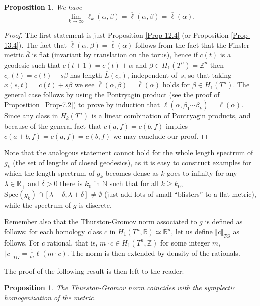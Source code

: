 \documentclass[JEP,XML,SOM,NoFloatCountersInSection,Unicode,published]{cedram}
\numberwithin{equation}{section}
\theoremstyle{plain}
\newtheorem{proposition}[theorem]{Proposition}
\theoremstyle{definition}
\theoremstyle{remark}
\begin{document}
\begin{proposition}
We have
\[
\lim_{k\to \infty} \ell_k(\alpha, \beta) = \overline \ell(\alpha, \beta) = \overline \ell(\alpha).
\]
\end{proposition}

\begin{proof}
The first statement is just Proposition \ref{Prop-12.4} (or Proposition \ref{Prop-13.4}). The fact that $\overline \ell(\alpha, \beta) = \overline \ell(\alpha)$ follows from the fact that the Finsler metric $\overline d$ is flat (\ie invariant by translation on the torus), hence if $c(t)$ is a geodesic such that $c(t+1)=c(t)+ \alpha$ and $\beta \in H_1(T^n)= \mathbb Z^n$ then $c_s(t)=c(t)+s\beta$ has length $\overline L (c_s)$, independent of~$s$, so that taking $x(s,t)=c(t)+s\beta$ we see $\overline \ell(\alpha, \beta) = \overline \ell(\alpha)$ holds for $\beta \in H_1(T^n)$. The general case follows by using the Pontryagin product (see the proof of Proposition~\ref{Prop-7.2}) to prove by induction that
$\overline \ell(\alpha, \beta_1\cdots \beta_k) = \overline \ell(\alpha) $. Since any class in $H_k(T^n)$ is a linear combination of Pontryagin products, and
because of the general fact that $c(a,f)=c(b,f)$ implies $c(a+b,f)=c(a,f)=c(b,f)$ we may conclude our proof.
\end{proof}
Note that the analogous statement cannot hold for the whole length
spectrum of~$g_{k}$ (\ie the set of lengths of closed geodesics), as
it is easy to construct examples for which the length spectrum of
$g_{k}$ becomes dense as $k$ goes to infinity \ie for any $\lambda
\in \mathbb{R}_{+}$ and $\delta > 0$ there is $k_{0}$ in $\mathbb{N}$
such that for all $k\geq k_{0}$, $\mathrm{Spec}(g_{k})\cap [\lambda -\delta,
\lambda + \delta] \not= \emptyset$ (just add lots of small ``blisters'' to a flat metric), while the spectrum of $\overline g$ is discrete.

Remember also that the Thurston-Gromov norm associated to $g$ is defined as follows: for each homology class $c$ in $H_{1}(T^n, {\mathbb R})\simeq {\mathbb R} ^n$, let us define
$ \Vert c \Vert_{TG}$ as follows. For $c$ rational, that is, $m\cdot c \in H_{1}(T^n, {\mathbb Z})$ for some integer $m$, $ \Vert c \Vert _{TG} = \frac{1}{m} \ell (m\cdot c)$. The norm is then extended by density of the rationals.

The proof of the following result is then left to the reader:

\begin{proposition}
The Thurston-Gromov norm coincides with the symplectic homo\-genization of the metric.
\end{proposition}
\end{document}

